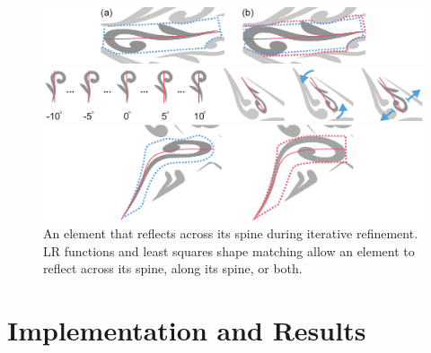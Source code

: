 \begin{figure}[h!]
\centering
\includegraphics[width=1.0\textwidth]{figures/flowpak/stretch.pdf}
\caption[Enlarge an element]
{\label{stretch_ornament}
(a) An element with its sub-region blob shown in dashed blue line. Note that any blob is constrained by the neighboring elements. 
(b) The dashed red line is the grown blob, which accommodates an enlarged element.}

\includegraphics[width=1.0\textwidth]{figures/flowpak/rotate_ornament.pdf}
\caption[Rotate an element]
{\label{rotate_ornament}
Top row: rotated versions of the original element. 
         The best rotation angle is chosen via least squares matching.
         Bottom row: original, rotated, and enlarged versions of an element.}

\includegraphics[width=1.0\textwidth]{figures/flowpak/flip.pdf}
\caption[Flip an element]
{\label{flip_shape}
An element that reflects across its spine during iterative refinement.
LR functions and least squares shape matching allow an element to reflect
across its spine, along its spine, or both.}
\end{figure}

\section{Implementation and Results}
\label{flowpak_implementation_and_results}

